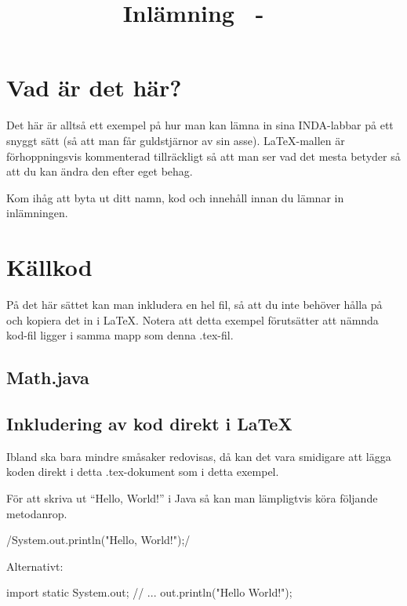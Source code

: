 \documentclass[a4paper,10pt,english,swedish]{article}
\title{Inlämning \assignmentnr\ - \course\ \coursename}
\date{\thedate}
\author{\theauthor}
\begin{document}

\newpage


\setcounter{page}{1}

\section{Vad är det här?}

Det här är alltså ett exempel på hur man kan lämna in sina INDA-labbar
på ett snyggt sätt (så att man får guldstjärnor av sin
asse). \LaTeX-mallen är förhoppningsvis kommenterad tillräckligt så
att man ser vad det mesta betyder så att du kan ändra den efter eget
behag.

Kom ihåg att byta ut ditt namn, kod och innehåll innan du lämnar in
inlämningen.

\section{Källkod}

På det här sättet kan man inkludera en hel fil, så att du inte behöver
hålla på och kopiera det in i \LaTeX. Notera att detta exempel
förutsätter att nämnda kod-fil ligger i samma mapp som denna
.tex-fil.

\subsection{Math.java}


\subsection{Inkludering av kod direkt i \LaTeX}

Ibland ska bara mindre småsaker redovisas, då kan det vara smidigare
att lägga koden direkt i detta .tex-dokument som i detta exempel.

För att skriva ut ``Hello, World!'' i Java så kan man lämpligtvis köra
följande metodanrop.

\java/System.out.println("Hello, World!");/

Alternativt:

\begin{javacode}
  import static System.out;
  // ...
  out.println("Hello World!");
\end{javacode}
\end{document}
